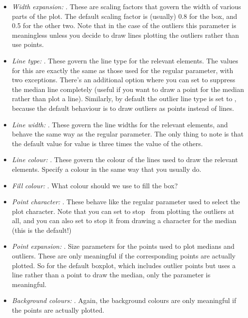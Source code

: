 \begin{itemize} \itemsep 1pt
\item {\it Width expansion:} . These are scaling factors that govern the width of various parts of the plot. The default scaling factor is (usually) 0.8 for the box, and 0.5 for the other two. Note that in the case of the outliers this parameter is meaningless unless you decide to draw lines plotting the outliers rather than use points. 
\item {\it Line type:} . These govern the line type for the relevant elements. The values for this are exactly the same as those used for the regular  parameter, with two exceptions. There's an additional option where you can set  to suppress the median line completely (useful if you want to draw a point for the median rather than plot a line). Similarly, by default the outlier line type is set to , because the default behaviour is to draw outliers as points instead of lines.
\item {\it Line width:} . These govern the line widths for the relevant elements, and behave the same way as the regular  parameter. The only thing to note is that the default value for  value is three times the value of the others.
\item {\it Line colour:} . These govern the colour of the lines used to draw the relevant elements. Specify a colour in the same way that you usually do.
\item {\it Fill colour:} . What colour should we use to fill the box? 
\item {\it Point character:} . These behave like the regular  parameter used to select the plot character. Note that you can set  to stop \R\ from plotting the outliers at all, and you can also set  to stop it from drawing a character for the median (this is the default!) 
\item {\it Point expansion:} . Size parameters for the points used to plot medians and outliers. These are only meaningful if the corresponding points are actually plotted. So for the default boxplot, which includes outlier points but uses a line rather than a point to draw the median, only the  parameter is meaningful.
\item {\it Background colours:} . Again, the background colours are only meaningful if the points are actually plotted.
\end{itemize}
